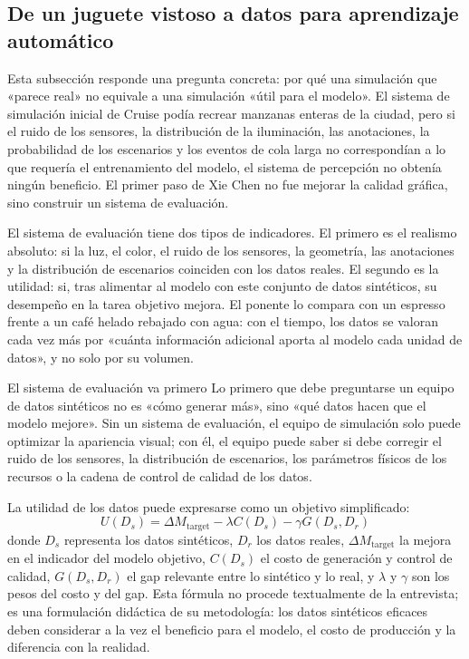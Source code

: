 \documentclass[a4paper]{article}
\begin{document}
\subsection{De un juguete vistoso a datos para aprendizaje automático}

Esta subsección responde una pregunta concreta: por qué una simulación que «parece real» no equivale a una simulación «útil para el modelo». El sistema de simulación inicial de Cruise podía recrear manzanas enteras de la ciudad, pero si el ruido de los sensores, la distribución de la iluminación, las anotaciones, la probabilidad de los escenarios y los eventos de cola larga no correspondían a lo que requería el entrenamiento del modelo, el sistema de percepción no obtenía ningún beneficio. El primer paso de Xie Chen no fue mejorar la calidad gráfica, sino construir un sistema de evaluación.

El sistema de evaluación tiene dos tipos de indicadores. El primero es el realismo absoluto: si la luz, el color, el ruido de los sensores, la geometría, las anotaciones y la distribución de escenarios coinciden con los datos reales. El segundo es la utilidad: si, tras alimentar al modelo con este conjunto de datos sintéticos, su desempeño en la tarea objetivo mejora. El ponente lo compara con un espresso frente a un café helado rebajado con agua: con el tiempo, los datos se valoran cada vez más por «cuánta información adicional aporta al modelo cada unidad de datos», y no solo por su volumen.

\begin{importantbox}{El sistema de evaluación va primero}
Lo primero que debe preguntarse un equipo de datos sintéticos no es «cómo generar más», sino «qué datos hacen que el modelo mejore». Sin un sistema de evaluación, el equipo de simulación solo puede optimizar la apariencia visual; con él, el equipo puede saber si debe corregir el ruido de los sensores, la distribución de escenarios, los parámetros físicos de los recursos o la cadena de control de calidad de los datos.
\end{importantbox}

La utilidad de los datos puede expresarse como un objetivo simplificado:
\[
U(D_s)=\Delta M_{\mathrm{target}}-\lambda C(D_s)-\gamma G(D_s,D_r)
\]
donde $D_s$ representa los datos sintéticos, $D_r$ los datos reales, $\Delta M_{\mathrm{target}}$ la mejora en el indicador del modelo objetivo, $C(D_s)$ el costo de generación y control de calidad, $G(D_s,D_r)$ el gap relevante entre lo sintético y lo real, y $\lambda$ y $\gamma$ son los pesos del costo y del gap. Esta fórmula no procede textualmente de la entrevista; es una formulación didáctica de su metodología: los datos sintéticos eficaces deben considerar a la vez el beneficio para el modelo, el costo de producción y la diferencia con la realidad.
\end{document}
